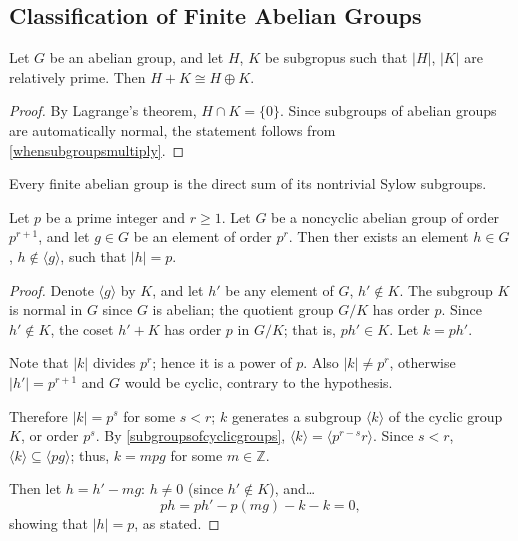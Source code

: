 \subsection{Classification of Finite Abelian Groups}\label{classificationoffiniteabeliangroups}

\begin{lemma}
Let $G$ be an abelian group, and let $H$, $K$ be subgropus such that $|H|$, $|K|$ are relatively prime. Then $H + K \cong H \oplus K$. 
\end{lemma}

\begin{proof}
By Lagrange's theorem, $H \cap K = \{ 0 \}$. Since subgroups of abelian groups are automatically normal, the statement follows from \ref{whensubgroupsmultiply}.
\end{proof}

\begin{corollary}
Every finite abelian group is the direct sum of its nontrivial Sylow subgroups.
\end{corollary}

\begin{lemma}
\label{elementoforderpinabeliangroup}
Let $p$ be a prime integer and $r \geq 1$. Let $G$ be a noncyclic abelian group of order $p^{r+1}$, and let $g \in G$ be an element of order $p^r$. Then ther exists an element $h \in G$,
$h \not \in \langle g \rangle$, such that $|h| = p$.
\end{lemma}

\begin{proof}
Denote $\langle g \rangle$ by $K$, and let $h'$ be any element of $G$, $h' \not \in K$. The subgroup $K$ is normal in $G$ since $G$ is abelian; the quotient group $G/K$ has order $p$.
Since $h' \not \in K$, the coset $h' + K$ has order $p$ in $G/K$; that is, $ph' \in K$. Let $k = ph'.$

Note that $|k|$ divides $p^r$; hence it is a power of $p$. Also $|k| \neq p^r$, otherwise $|h'| = p^{r+1}$ and $G$ would be cyclic, contrary to the hypothesis.

Therefore $|k| = p^s$ for some $s < r$; $k$ generates a subgroup $\langle k \rangle$ of the cyclic group $K$, or order $p^s$. By \ref{subgroupsofcyclicgroups}, $\langle k \rangle = \langle p^{r-s}r \rangle$.
Since $s < r$, $\langle k \rangle \subseteq \langle pg \rangle$; thus, $k = mpg$ for some $m \in \mathbb{Z}$.

Then let $h = h' - mg$: $h \neq 0$ (since $h' \not \in K$), and\dots
$$ph = ph' - p(mg) - k -k =0,$$
showing that $|h| = p$, as stated.
\end{proof}

